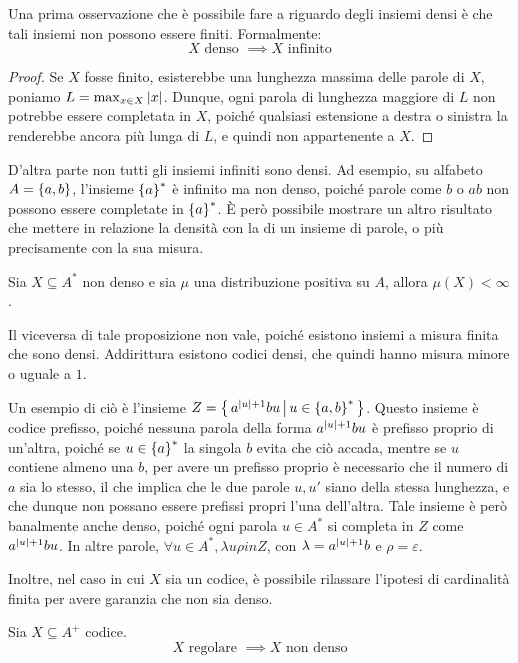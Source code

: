 Una prima osservazione che è possibile fare a riguardo degli insiemi densi è che tali insiemi non possono essere finiti.
Formalmente:
\[X \text{ denso } \implies X \text{ infinito}\]
\begin{proof}
  Se \(X\) fosse finito, esisterebbe una lunghezza massima delle parole di \(X\), poniamo \(L = \max_{x \in X} \left|x\right|\).
  Dunque, ogni parola di lunghezza maggiore di \(L\) non potrebbe essere completata in \(X\), poiché qualsiasi estensione a destra o sinistra la renderebbe ancora più lunga di \(L\), e quindi non appartenente a \(X\).
\end{proof}

D'altra parte non tutti gli insiemi infiniti sono densi. Ad esempio, su alfabeto \(A = \set{a,b}\), l'insieme \(\set{a}^*\) è infinito ma non denso, poiché parole come \(b\) o \(ab\) non possono essere completate in \(\set{a}^*\).
È però possibile mostrare un altro risultato che mettere in relazione la densità con la  di un insieme di parole, o più precisamente con la sua misura.

\begin{proposition}
  Sia \(X \subseteq A^*\) non denso e sia \(\mu\) una distribuzione positiva su \(A\), allora \(\mu(X) < \infty\).
\end{proposition}

Il viceversa di tale proposizione non vale, poiché esistono insiemi a misura finita che sono densi. Addirittura esistono codici densi, che quindi hanno misura minore o uguale a \(1\).

\begin{example}[label=ex:dense_code]{}
  Un esempio di ciò è l'insieme \(Z = \set{a^{\abs{u}+1}bu}[u \in \set{a,b}^*]\). Questo insieme è codice prefisso, poiché nessuna parola della forma \(a^{\left|u\right|+1}bu\) è prefisso proprio di un'altra,
  poiché se \(u \in \set{a}^*\) la singola \(b\) evita che ciò accada, mentre se \(u\) contiene almeno una \(b\), per avere un prefisso proprio è necessario che il numero di \(a\) sia lo stesso, il che implica che le due parole \(u, u'\) siano della stessa lunghezza, e che dunque non possano essere prefissi propri l'una dell'altra.
  Tale insieme è però banalmente anche denso, poiché ogni parola \(u \in A^*\) si completa in \(Z\) come \(a^{\left|u\right|+1}bu\). In altre parole, \(\forall u \in A^*, \lambda u \rho in Z\), con \(\lambda = a^{\left|u\right|+1}b\) e \(\rho = \varepsilon\).
\end{example}

Inoltre, nel caso in cui \(X\) sia un codice, è possibile rilassare l'ipotesi di cardinalità finita per avere garanzia che non sia denso.
\begin{proposition}
  Sia \(X \subseteq A^+\) codice.
  \[ X \text{ regolare } \implies X \text{ non denso}\]
\end{proposition}

